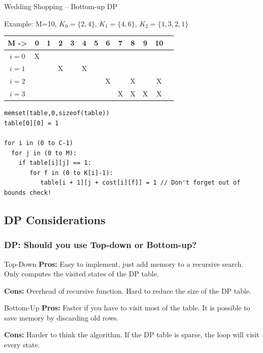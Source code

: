 \begin{frame}[fragile]{Wedding Shopping -- Bottom-up DP}

  Example: M=10, $K_0=\{2,4\}$, $K_1=\{4,6\}$, $K_2=\{1,3,2,1\}$
  \bigskip

  \begin{tabular}{|c||c|c|c|c|c|c|c|c|c|c|c|c|}
    \hline
    M -> & 0 & 1 & 2 & 3 & 4 & 5 & 6 & 7 & 8 & 9 & 10\\
    \hline
    $i=0$ & X & & & & & & & & & & \\
    $i=1$ & & & X & & X & & & & & & \\
    $i=2$ & & & & & & & X & & X & & X\\
    $i=3$ & & & & & & & & X & X & X & X\\
    \hline
  \end{tabular}
  {\smaller
  \begin{block}{}
\begin{verbatim}
memset(table,0,sizeof(table))
table[0][0] = 1

for i in (0 to C-1)
  for j in (0 to M):
    if table[i][j] == 1:
       for f in (0 to K[i]-1):
          table[i + 1][j + cost[i][f]] = 1 // Don't forget out of bounds check!
\end{verbatim}
  \end{block}}
\end{frame}

\subsection{DP Considerations}
\begin{frame}
  \frametitle{DP: Should you use Top-down or Bottom-up?}

  \begin{block}{Top-Down}
    {\bf Pros:} Easy to implement, just add memory to a recursive search. Only computes the visited states of the DP table. \medskip

    {\bf Cons:} Overhead of recursive function. Hard to reduce the size of the DP table.
  \end{block}

  \begin{block}{Bottom-Up}
    {\bf Pros:} Faster if you have to visit most of the table. It is possible to save memory by discarding old rows.\medskip

    {\bf Cons:} Harder to think the algorithm. If the DP table is sparse, the loop will visit every state.
  \end{block}
\end{frame}

